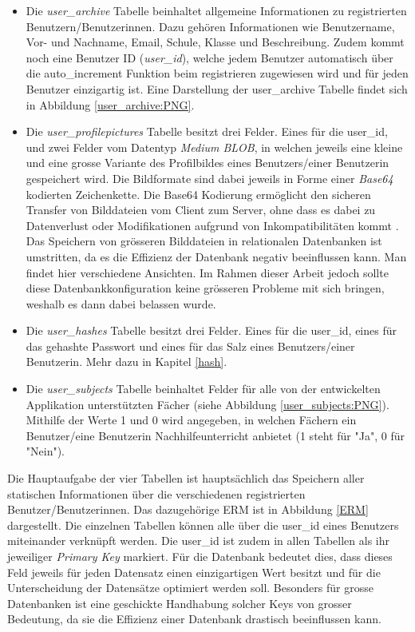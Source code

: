 \documentclass[../main.tex]{subfiles}
\begin{document}
	\begin{itemize}
		\item Die \emph{user\_archive} Tabelle beinhaltet allgemeine Informationen zu registrierten Benutzern/Benutzerinnen. Dazu gehören Informationen wie Benutzername, Vor- und Nachname, Email, Schule, Klasse und Beschreibung. Zudem kommt noch eine Benutzer ID (\emph{user\_id}), welche jedem Benutzer automatisch über die auto\_increment Funktion beim registrieren zugewiesen wird und für jeden Benutzer einzigartig ist. Eine Darstellung der user\_archive Tabelle findet sich in Abbildung \ref{user_archive:PNG}.
		\item Die \emph{user\_profilepictures} Tabelle besitzt drei Felder. Eines für die user\_id, und zwei Felder vom Datentyp \emph{Medium BLOB}, in welchen jeweils eine kleine und eine grosse Variante des Profilbildes eines Benutzers/einer Benutzerin gespeichert wird. Die Bildformate sind dabei jeweils in Forme einer \emph{Base64} kodierten Zeichenkette. Die Base64 Kodierung ermöglicht den sicheren Transfer von Bilddateien vom Client zum Server, ohne dass es dabei zu Datenverlust oder Modifikationen aufgrund von Inkompatibilitäten kommt \cite{base64}. Das Speichern von grösseren Bilddateien in relationalen Datenbanken ist umstritten, da es die Effizienz der Datenbank negativ beeinflussen kann. Man findet hier verschiedene Ansichten. Im Rahmen dieser Arbeit jedoch sollte diese Datenbankkonfiguration keine grösseren Probleme mit sich bringen, weshalb es dann dabei belassen wurde.
		\item Die \emph{user\_hashes} Tabelle besitzt drei Felder. Eines für die user\_id, eines für das gehashte Passwort und eines für das Salz eines Benutzers/einer Benutzerin. Mehr dazu in Kapitel \ref{hash}.
		\item Die \emph{user\_subjects} Tabelle beinhaltet Felder für alle von der entwickelten Applikation unterstützten Fächer (siehe Abbildung \ref{user_subjects:PNG}). Mithilfe der Werte 1 und 0 wird angegeben, in welchen Fächern ein Benutzer/eine Benutzerin Nachhilfeunterricht anbietet (1 steht für "Ja", 0 für "Nein").
	\end{itemize}
	
	 Die Hauptaufgabe der vier Tabellen ist hauptsächlich das Speichern aller statischen Informationen über die verschiedenen registrierten Benutzer/Benutzerinnen. Das dazugehörige ERM ist in Abbildung \ref{ERM} dargestellt. Die einzelnen Tabellen können alle über die user\_id eines Benutzers miteinander verknüpft werden. Die user\_id ist zudem in allen Tabellen als ihr jeweiliger \emph{Primary Key} markiert. Für die Datenbank bedeutet dies, dass dieses Feld jeweils für jeden Datensatz einen einzigartigen Wert besitzt und für die Unterscheidung der Datensätze optimiert werden soll. Besonders für grosse Datenbanken ist eine geschickte Handhabung solcher Keys von grosser Bedeutung, da sie die Effizienz einer Datenbank drastisch beeinflussen kann.
	
\end{document}
